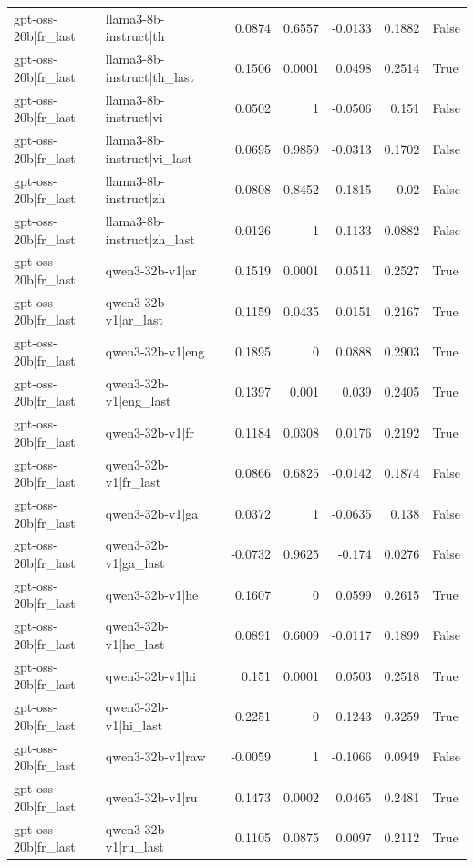 \begin{table}
\begin{tabular}{l l r r r r l}
gpt-oss-20b|fr_last & llama3-8b-instruct|th & 0.0874 & 0.6557 & -0.0133 & 0.1882 & False \\
gpt-oss-20b|fr_last & llama3-8b-instruct|th_last & 0.1506 & 0.0001 & 0.0498 & 0.2514 & True \\
gpt-oss-20b|fr_last & llama3-8b-instruct|vi & 0.0502 & 1 & -0.0506 & 0.151 & False \\
gpt-oss-20b|fr_last & llama3-8b-instruct|vi_last & 0.0695 & 0.9859 & -0.0313 & 0.1702 & False \\
gpt-oss-20b|fr_last & llama3-8b-instruct|zh & -0.0808 & 0.8452 & -0.1815 & 0.02 & False \\
gpt-oss-20b|fr_last & llama3-8b-instruct|zh_last & -0.0126 & 1 & -0.1133 & 0.0882 & False \\
gpt-oss-20b|fr_last & qwen3-32b-v1|ar & 0.1519 & 0.0001 & 0.0511 & 0.2527 & True \\
gpt-oss-20b|fr_last & qwen3-32b-v1|ar_last & 0.1159 & 0.0435 & 0.0151 & 0.2167 & True \\
gpt-oss-20b|fr_last & qwen3-32b-v1|eng & 0.1895 & 0 & 0.0888 & 0.2903 & True \\
gpt-oss-20b|fr_last & qwen3-32b-v1|eng_last & 0.1397 & 0.001 & 0.039 & 0.2405 & True \\
gpt-oss-20b|fr_last & qwen3-32b-v1|fr & 0.1184 & 0.0308 & 0.0176 & 0.2192 & True \\
gpt-oss-20b|fr_last & qwen3-32b-v1|fr_last & 0.0866 & 0.6825 & -0.0142 & 0.1874 & False \\
gpt-oss-20b|fr_last & qwen3-32b-v1|ga & 0.0372 & 1 & -0.0635 & 0.138 & False \\
gpt-oss-20b|fr_last & qwen3-32b-v1|ga_last & -0.0732 & 0.9625 & -0.174 & 0.0276 & False \\
gpt-oss-20b|fr_last & qwen3-32b-v1|he & 0.1607 & 0 & 0.0599 & 0.2615 & True \\
gpt-oss-20b|fr_last & qwen3-32b-v1|he_last & 0.0891 & 0.6009 & -0.0117 & 0.1899 & False \\
gpt-oss-20b|fr_last & qwen3-32b-v1|hi & 0.151 & 0.0001 & 0.0503 & 0.2518 & True \\
gpt-oss-20b|fr_last & qwen3-32b-v1|hi_last & 0.2251 & 0 & 0.1243 & 0.3259 & True \\
gpt-oss-20b|fr_last & qwen3-32b-v1|raw & -0.0059 & 1 & -0.1066 & 0.0949 & False \\
gpt-oss-20b|fr_last & qwen3-32b-v1|ru & 0.1473 & 0.0002 & 0.0465 & 0.2481 & True \\
gpt-oss-20b|fr_last & qwen3-32b-v1|ru_last & 0.1105 & 0.0875 & 0.0097 & 0.2112 & True \\

\end{tabular}
\end{table}
